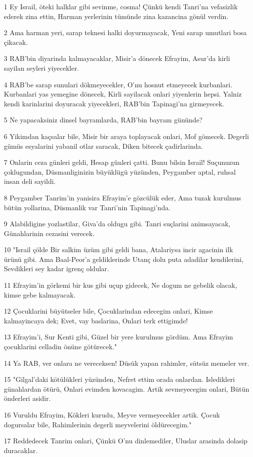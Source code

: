 \par 1 Ey Israil, öteki halklar gibi sevinme, cosma! Çünkü kendi Tanri'na vefasizlik ederek zina ettin, Harman yerlerinin tümünde zina kazancina gönül verdin.
\par 2 Ama harman yeri, sarap teknesi halki doyurmayacak, Yeni sarap umutlari bosa çikacak.
\par 3 RAB'bin diyarinda kalmayacaklar, Misir'a dönecek Efrayim, Asur'da kirli sayilan seyleri yiyecekler.
\par 4 RAB'be sarap sunulari dökmeyecekler, O'nu hosnut etmeyecek kurbanlari. Kurbanlari yas yemegine dönecek, Kirli sayilacak onlari yiyenlerin hepsi. Yalniz kendi karinlarini doyuracak yiyecekleri, RAB'bin Tapinagi'na girmeyecek.
\par 5 Ne yapacaksiniz dinsel bayramlarda, RAB'bin bayram gününde?
\par 6 Yikimdan kaçsalar bile, Misir bir araya toplayacak onlari, Mof gömecek. Degerli gümüs esyalarini yabanil otlar saracak, Diken bitecek çadirlarinda.
\par 7 Onlarin ceza günleri geldi, Hesap günleri çatti. Bunu bilsin Israil! Suçunuzun çoklugundan, Düsmanliginizin büyüklügü yüzünden, Peygamber aptal, ruhsal insan deli sayildi.
\par 8 Peygamber Tanrim'in yanisira Efrayim'e gözcülük eder, Ama tuzak kurulmus bütün yollarina, Düsmanlik var Tanri'nin Tapinagi'nda.
\par 9 Alabildigine yozlastilar, Giva'da oldugu gibi. Tanri suçlarini animsayacak, Günahlarinin cezasini verecek.
\par 10 "Israil çölde Bir salkim üzüm gibi geldi bana, Atalariysa incir agacinin ilk ürünü gibi. Ama Baal-Peor'a geldiklerinde Utanç dolu puta adadilar kendilerini, Sevdikleri sey kadar igrenç oldular.
\par 11 Efrayim'in görkemi bir kus gibi uçup gidecek, Ne dogum ne gebelik olacak, kimse gebe kalmayacak.
\par 12 Çocuklarini büyütseler bile, Çocuklarindan edecegim onlari, Kimse kalmayincaya dek; Evet, vay baslarina, Onlari terk ettigimde!
\par 13 Efrayim'i, Sur Kenti gibi, Güzel bir yere kurulmus gördüm. Ama Efrayim çocuklarini celladin önüne götürecek."
\par 14 Ya RAB, ver onlara ne vereceksen! Düsük yapan rahimler, sütsüz memeler ver.
\par 15 "Gilgal'daki kötülükleri yüzünden, Nefret ettim orada onlardan. Isledikleri günahlardan ötürü, Onlari evimden kovacagim. Artik sevmeyecegim onlari, Bütün önderleri asidir.
\par 16 Vuruldu Efrayim, Kökleri kurudu, Meyve vermeyecekler artik. Çocuk dogursalar bile, Rahimlerinin degerli meyvelerini öldürecegim."
\par 17 Reddedecek Tanrim onlari, Çünkü O'nu dinlemediler, Uluslar arasinda dolasip duracaklar.

